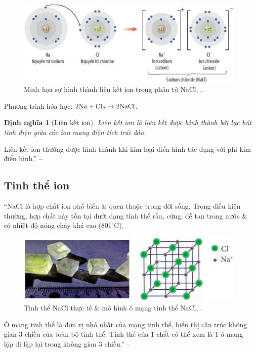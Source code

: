 \documentclass[oneside]{book}
\numberwithin{equation}{section}
\newtheorem{dinhnghia}{Định nghĩa}[section]
\begin{document}
\begin{figure}[H]
	\centering
	\includegraphics[scale=0.15]{su_hinh_thanh_lien_ket_ion_trong_NaCl}
	\caption{Minh họa sự hình thành liên kết ion trong phân tử NaCl, \cite[Hình 9.2, p. 56]{SGK_Hoa_Hoc_10_Chan_Troi_Sang_Tao}.}
\end{figure}
Phương trình hóa học: $\rm 2Na + Cl_2\to 2NaCl$.

\begin{dinhnghia}[Liên kết ion]
	\emph{Liên kết ion} là liên kết được hình thành bởi lực hút tĩnh điện giữa các ion mang điện tích trái dấu.
\end{dinhnghia}
Liên kết ion thường được hình thành khi kim loại điển hình tác dụng với phi kim điển hình.'' -- \cite[p. 56]{SGK_Hoa_Hoc_10_Chan_Troi_Sang_Tao}

\subsection{Tinh thể ion}
``NaCl là hợp chất ion phổ biến \& quen thuộc trong đời sống. Trong điều kiện thường, hợp chất này tồn tại dưới dạng tinh thể rắn, cứng, dễ tan trong nước \& có nhiệt độ nóng chảy khá cao ($801^\circ$C).

\begin{figure}[H]
	\centering
	\includegraphics[scale=0.15]{tinh_the_NaCl}
	\caption{Tinh thể NaCl thực tế \& mô hình ô mạng tinh thể NaCl, \cite[Hình 9.3, p. 56]{SGK_Hoa_Hoc_10_Chan_Troi_Sang_Tao}.}
\end{figure}
Ô mạng tinh thể là đơn vị nhỏ nhất của mạng tinh thể, hiển thị cấu trúc không gian 3 chiều của toàn bộ tinh thể. Tinh thể của 1 chất có thể xem là 1 ô mạng lặp đi lặp lại trong không gian 3 chiều.'' -- \cite[p. 56]{SGK_Hoa_Hoc_10_Chan_Troi_Sang_Tao}
\end{document}
